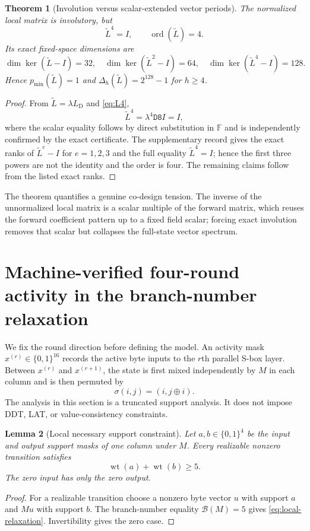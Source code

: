 \documentclass[10pt,reqno]{amsart}
\theoremstyle{plain}
\newtheorem{theorem}{Theorem}[section]
\newtheorem{lemma}[theorem]{Lemma}
\theoremstyle{remark}\newtheorem{remark}[theorem]{Remark}
\theoremstyle{definition}\newtheorem{definition}[theorem]{Definition}
\newcommand{\F}{\mathbb F}
\newcommand{\ord}{\operatorname{ord}}
\newcommand{\hex}[1]{\mathtt{#1}}
\begin{document}
\begin{theorem}[Involution versus scalar-extended vector periods]\label{thm:tradeoff}
The normalized local matrix is involutory, but
\[
\widetilde L^4=I,
\qquad
\ord(\widetilde L)=4.
\]
Its exact fixed-space dimensions are
\[
\dim\ker(\widetilde L-I)=32,
\quad
\dim\ker(\widetilde L^2-I)=64,
\quad
\dim\ker(\widetilde L^4-I)=128.
\]
Hence $p_{\min}(\widetilde L)=1$ and $\Delta_h(\widetilde L)=2^{128}-1$ for $h\ge4$.
\end{theorem}
\begin{proof}
From $\widetilde L=\lambda L_{\mathrm{D}}$ and \eqref{eq:L4},
\begin{equation}
\widetilde L^4=\lambda^4\hex{D8}I=I,
\end{equation}
where the scalar equality follows by direct substitution in $\F$ and is independently confirmed by the exact certificate. The supplementary record gives the exact ranks of $\widetilde L^e-I$ for $e=1,2,3$ and the full equality $\widetilde L^4=I$; hence the first three powers are not the identity and the order is four. The remaining claims follow from the listed exact ranks. \end{proof}

The theorem quantifies a genuine co-design tension. The inverse of the unnormalized local matrix is a scalar multiple of the forward matrix, which reuses the forward coefficient pattern up to a fixed field scalar; forcing exact involution removes that scalar but collapses the full-state vector spectrum.

\section{Machine-verified four-round activity in the branch-number relaxation}
\label{sec:wide-trail}
We fix the round direction before defining the model. An activity mask $x^{(r)}\in\{0,1\}^{16}$ records the active byte inputs to the $r$th parallel S-box layer. Between $x^{(r)}$ and $x^{(r+1)}$, the state is first mixed independently by $M$ in each column and is then permuted by
\[
\sigma(i,j)=(i,j\oplus i).
\]
The analysis in this section is a truncated support analysis. It does not impose DDT, LAT, or value-consistency constraints.

\begin{lemma}[Local necessary support constraint]\label{lem:local-relaxation}
Let $a,b\in\{0,1\}^4$ be the input and output support masks of one column under $M$. Every realizable nonzero transition satisfies
\begin{equation}
\operatorname{wt}(a)+\operatorname{wt}(b)\ge5.
\label{eq:local-relaxation}
\end{equation}
The zero input has only the zero output.
\end{lemma}
\begin{proof}
For a realizable transition choose a nonzero byte vector $u$ with support $a$ and $Mu$ with support $b$. The branch-number equality $\mathcal B(M)=5$ gives \eqref{eq:local-relaxation}. Invertibility gives the zero case.
\end{proof}
\end{document}
